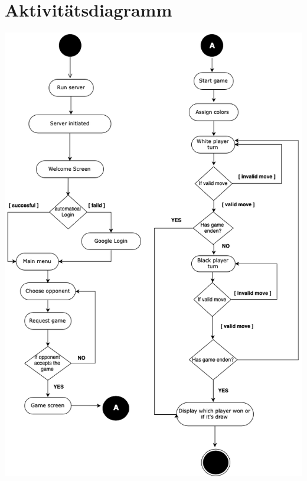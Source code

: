 \documentclass[parskip=full]{scrartcl}
\begin{document}
	\section{Aktivitätsdiagramm}
	\begin{minipage}{\linewidth}
		\centering
		\includegraphics[width=1\linewidth]{Diagramme/Aktivitaetsdiagramm}
		\label{fig:aktivitaetsdiagramm}
	\end{minipage}
	
\end{document}
